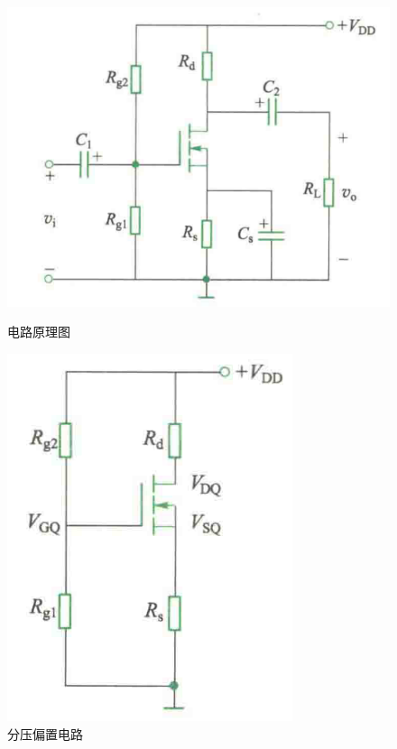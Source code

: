 \documentclass[10pt, a4paper]{article} %
\begin{document}
\begin{figure}[ht]
    \centering
    \begin{minipage}[ht]{0.6\textwidth}
        \centering
        \includegraphics[width=\linewidth]{image/5.png}
        \caption{电路原理图}
        \label{fig:side:e}
    \end{minipage}
    \hfill
    \begin{minipage}[ht]{0.35\textwidth}
        \centering
        \includegraphics[width=\linewidth]{image/6.png}
        \caption{分压偏置电路}
        \label{fig:side:f}
    \end{minipage}
\end{figure}
\end{document}
